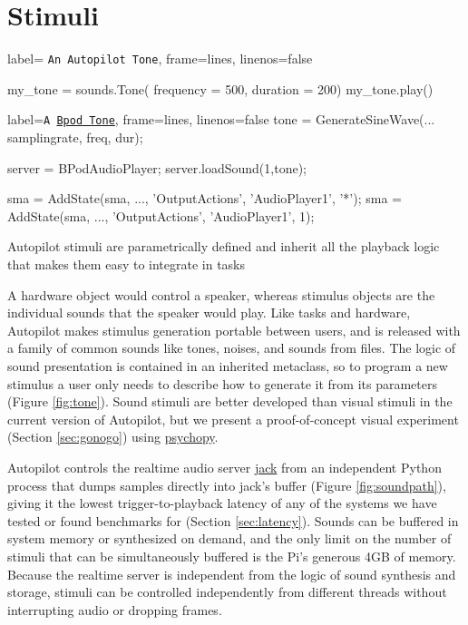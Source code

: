 \section{Stimuli}
\label{sec:stim}


\begin{marginfigure}[0.45cm]
\begin{pythoncode*}{
label= \texttt{An Autopilot Tone},
frame=lines,
linenos=false}

my_tone = sounds.Tone(
    frequency = 500,
    duration  = 200)
my_tone.play()
\end{pythoncode*}
\vspace{-18pt}
\begin{matlabcode*}{
label=\texttt{A \href{https://github.com/sanworks/Bpod_Gen2/blob/master/Examples/Protocols/AnalogSound2AFC/AnalogSound2AFC.m}{Bpod Tone}},
frame=lines,
linenos=false}
tone = GenerateSineWave(...
samplingrate, freq, dur);

server = BPodAudioPlayer;
server.loadSound(1,tone);

sma = AddState(sma, ...,
'OutputActions', 
{'AudioPlayer1', '*'});
sma = AddState(sma, ...,
'OutputActions',
{'AudioPlayer1', 1});
\end{matlabcode*}
\caption{Autopilot stimuli are parametrically defined and inherit all the playback logic that makes them easy to integrate in tasks}
\label{fig:tone}
\end{marginfigure}

A hardware object would control a speaker, whereas stimulus objects are the individual sounds that the speaker would play. Like tasks and hardware, Autopilot makes stimulus generation portable between users, and is released with a family of common sounds like tones, noises, and sounds from files. The logic of sound presentation is contained in an inherited metaclass, so to program a new stimulus a user only needs to describe how to generate it from its parameters (Figure \ref{fig:tone}).  Sound stimuli are better developed than visual stimuli in the current version of Autopilot, but we present a proof-of-concept visual experiment (Section \ref{sec:gonogo}) using \href{https://www.psychopy.org/}{psychopy}\citep{peircePsychoPy2ExperimentsBehavior2019}.

Autopilot controls the realtime audio server \href{http://jackaudio.org/}{jack} from an independent Python process that dumps samples directly into jack's buffer (Figure \ref{fig:soundpath}), giving it the lowest trigger-to-playback latency of any of the systems we have tested or found benchmarks for (Section \ref{sec:latency}). Sounds can be buffered in system memory or synthesized on demand, and the only limit on the number of stimuli that can be simultaneously buffered is the Pi's generous 4GB of memory. Because the realtime server is independent from the logic of sound synthesis and storage, stimuli can be controlled independently from different threads without interrupting audio or dropping frames.

